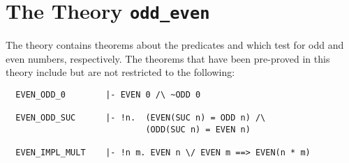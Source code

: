 \section{The Theory {\tt odd\_even}}

The theory 
contains theorems about the predicates  and  which test for odd and even
numbers, respectively. 
The theorems that have been pre-proved in this theory include but are not
restricted to the following:

\begin{hol}
\begin{verbatim}
  EVEN_ODD_0        |- EVEN 0 /\ ~ODD 0

  EVEN_ODD_SUC      |- !n.  (EVEN(SUC n) = ODD n) /\
                            (ODD(SUC n) = EVEN n)

  EVEN_IMPL_MULT    |- !n m. EVEN n \/ EVEN m ==> EVEN(n * m)
\end{verbatim}\end{hol}
